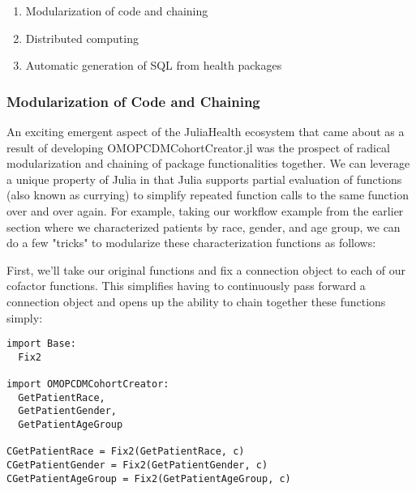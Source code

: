 \documentclass{juliacon}
\begin{document}
\begin{enumerate}

\item Modularization of code and chaining

\item Distributed computing

\item Automatic generation of SQL from health packages

\end{enumerate}

\subsubsection{Modularization of Code and Chaining}

An exciting emergent aspect of the JuliaHealth ecosystem that came about as a result of developing OMOPCDMCohortCreator.jl was the prospect of radical modularization and chaining of package functionalities together.
We can leverage a unique property of Julia in that Julia supports partial evaluation of functions (also known as currying) to simplify repeated function calls to the same function over and over again.
For example, taking our workflow example from the earlier section where we characterized patients by race, gender, and age group, we can do a few "tricks" to modularize these characterization functions as follows:

First, we'll take our original functions and fix a connection object to each of our cofactor functions.
This simplifies having to continuously pass forward a connection object and opens up the ability to chain together these functions simply:

\begin{listing}[!ht]
\begin{verbatim}
import Base:
  Fix2

import OMOPCDMCohortCreator:
  GetPatientRace,
  GetPatientGender,
  GetPatientAgeGroup

CGetPatientRace = Fix2(GetPatientRace, c)
CGetPatientGender = Fix2(GetPatientGender, c)
CGetPatientAgeGroup = Fix2(GetPatientAgeGroup, c)
\end{verbatim}
\caption{}
\label{listing:}
\end{listing}
\end{document}
